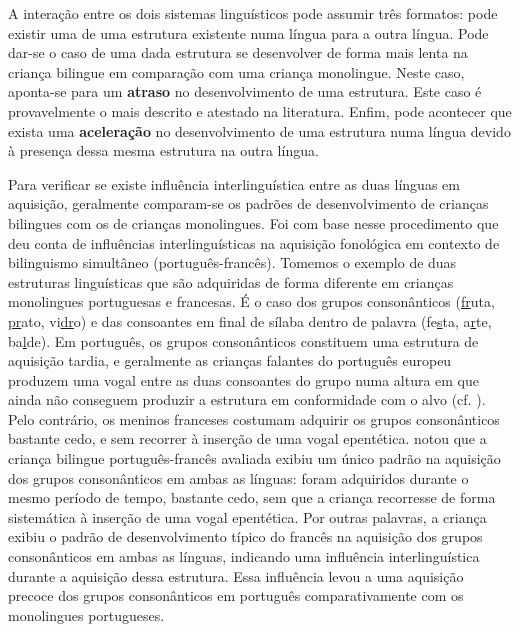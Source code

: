 \documentclass[output=paper]{LSP/langsci}
\begin{document}
A interação entre os dois sistemas linguísticos pode assumir três formatos: pode existir uma \textbf{} de uma estrutura existente numa língua para a outra língua. Pode dar-se o caso de uma dada estrutura se desenvolver de forma mais lenta na criança bilingue em comparação com uma criança monolingue. Neste caso, aponta-se para um \textbf{atraso} no desenvolvimento de uma estrutura. Este caso é provavelmente o mais descrito e atestado na literatura. Enfim, pode acontecer que exista uma \textbf{aceleração} no desenvolvimento de uma estrutura numa língua devido à presença dessa mesma estrutura na outra língua.\newpage

Para verificar se existe influência interlinguística entre as duas línguas em aquisição, geralmente comparam-se os padrões de desenvolvimento de crianças bilingues com os de crianças monolingues. Foi com base nesse procedimento que \cite{almeida2011} deu conta de influências interlinguísticas na aquisição fonológica em contexto de bilinguismo simultâneo (português-francês). Tomemos o exemplo de duas estruturas linguísticas que são adquiridas de forma diferente em crianças monolingues portuguesas e francesas. É o caso dos grupos consonânticos (\underline{fr}uta, \underline{pr}ato, vi\underline{dr}o) e das consoantes em final de sílaba dentro de palavra (fe\underline{s}ta, a\underline{r}te, ba\underline{l}de). Em português, os grupos consonânticos constituem uma estrutura de aquisição tardia, e geralmente as crianças falantes do português europeu produzem uma vogal entre as duas consoantes do grupo numa altura em que ainda não conseguem produzir a estrutura em conformidade com o alvo (cf. \citealt{freitas2017}). Pelo contrário, os meninos franceses costumam adquirir os grupos consonânticos bastante cedo, e sem recorrer à inserção de uma vogal epentética. \cite{almeida2011} notou que a criança bilingue português-francês avaliada exibiu um único padrão na aquisição dos grupos consonânticos em ambas as línguas: foram adquiridos durante o mesmo período de tempo, bastante cedo, sem que a criança recorresse de forma sistemática à inserção de uma vogal epentética. Por outras palavras, a criança exibiu o padrão de desenvolvimento típico do francês na aquisição dos grupos consonânticos em ambas as línguas, indicando uma influência interlinguística durante a aquisição dessa estrutura. Essa influência levou a uma aquisição precoce dos grupos consonânticos em português comparativamente com os monolingues portugueses. 
\end{document}

